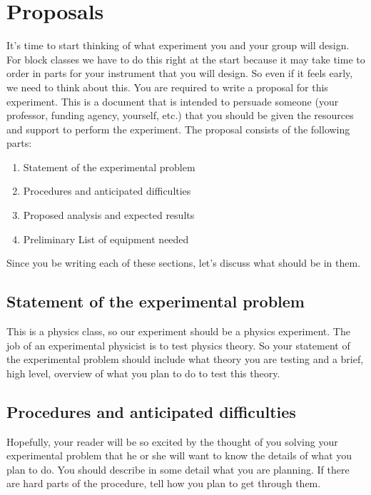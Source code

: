 \section{Proposals}

It's time to start thinking of what experiment you and your group will design. For block classes we have to do this right at the start because it may take time to order in parts for your instrument that you will design. So even if it feels early, we need to think about this. You are required to write a proposal for this experiment. This is a document that is intended to persuade someone (your professor,  funding agency, yourself, etc.) that you should be given the resources and support to perform the experiment. The proposal consists of the following parts:

\begin{enumerate}
	\item Statement of the experimental problem
	
	\item Procedures and anticipated difficulties
	
	\item Proposed analysis and expected results
	
	\item Preliminary List of equipment needed
\end{enumerate}

\noindent Since you be writing each of these sections, let's discuss what should be in them.

\subsection{Statement of the experimental problem}

This is a physics class, so our experiment should be a physics experiment. The job of an experimental physicist is to test physics theory. So your statement of the experimental problem should include what theory you are testing and a brief, high level, overview of what you plan to do to test this theory.

\subsection{Procedures and anticipated difficulties}

Hopefully, your reader will be so excited by the thought of you solving your experimental problem that he or she will want to know the details of what you plan to do. You should describe in some detail what you are planning. If there are hard parts of the procedure, tell how you plan to get through them.

